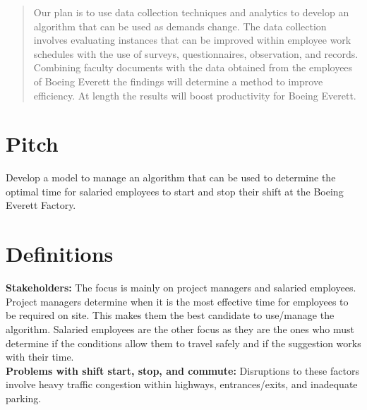 \documentclass[onecolumn, draftclsnofoot,10pt, compsoc]{IEEEtran}
\begin{document}
\begin{titlepage}
\begin{singlespace}
\begin{abstract}
        Our plan is to use data collection techniques and analytics to develop an algorithm that can be used as demands change. 
        The data collection involves evaluating instances that can be improved within employee work schedules with the use of surveys, questionnaires, observation, and records. 
        Combining faculty documents with the data obtained from the employees of Boeing Everett the findings will determine a method to improve efficiency. At length the results will boost productivity for Boeing Everett. 
        \end{abstract}     
    \end{singlespace}
\end{titlepage}
\newpage
{}
\tableofcontents
\clearpage

\section{Pitch}
\indent \indent Develop a model to manage an algorithm that can be used to determine the optimal time for salaried employees to start and stop their shift at the Boeing Everett Factory. 

\section{Definitions}
\textbf{Stakeholders:} The focus is mainly on project managers and salaried employees. 
Project managers determine when it is the most effective time for employees to be required on site. 
This makes them the best candidate to use/manage the algorithm. 
Salaried employees are the other focus as they are the ones who must determine if the conditions allow them to travel safely and if the suggestion works with their time. \\
\textbf{Problems with shift start, stop, and commute:} Disruptions to these factors involve heavy traffic congestion within highways, entrances/exits, and inadequate parking. 

\end{document}
